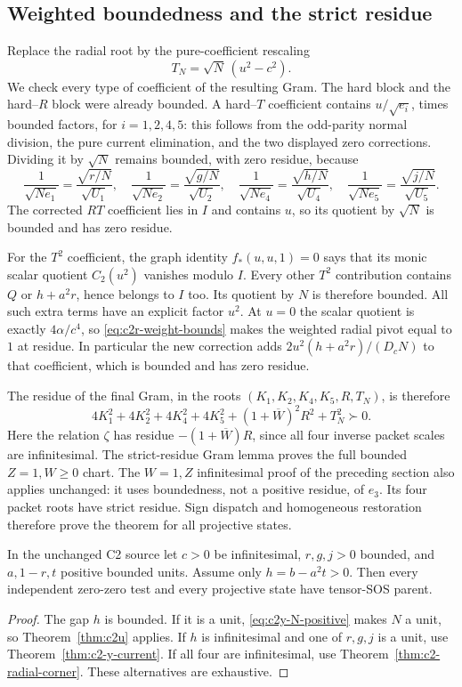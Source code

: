 \subsection{Weighted boundedness and the strict residue}
Replace the radial root by the pure-coefficient rescaling
\[
T_N=\sqrt N\,(u^2-c^2).
\]
We check every type of coefficient of the resulting Gram.  The hard
block and the hard--$R$ block were already bounded.  A hard--$T$
coefficient contains $u/\sqrt{e_i}$, times bounded factors, for
$i=1,2,4,5$: this follows from the odd-parity normal division, the pure
current elimination, and the two displayed zero corrections.  Dividing
it by $\sqrt N$ remains bounded, with zero residue, because
\[
\frac1{\sqrt{Ne_1}}=\frac{\sqrt{r/N}}{\sqrt{U_1}},\quad
\frac1{\sqrt{Ne_2}}=\frac{\sqrt{g/N}}{\sqrt{U_2}},\quad
\frac1{\sqrt{Ne_4}}=\frac{\sqrt{h/N}}{\sqrt{U_4}},\quad
\frac1{\sqrt{Ne_5}}=\frac{\sqrt{j/N}}{\sqrt{U_5}}.
\]
The corrected $RT$ coefficient lies in $I$ and contains $u$, so its
quotient by $\sqrt N$ is bounded and has zero residue.

For the $T^2$ coefficient, the graph identity $f_*(u,u,1)=0$ says that
its monic scalar quotient $C_2(u^2)$ vanishes modulo $I$.  Every other
$T^2$ contribution contains $Q$ or $h+a^2r$, hence belongs to $I$ too.
Its quotient by $N$ is therefore bounded.  All such extra terms have
an explicit factor $u^2$.  At $u=0$ the scalar quotient is exactly
$4\alpha/c^4$, so \eqref{eq:c2r-weight-bounds} makes the weighted radial
pivot equal to $1$ at residue.  In particular the new correction adds
$2u^2(h+a^2r)/(D_cN)$ to that coefficient, which is bounded and has
zero residue.

The residue of the final Gram, in the roots
$(K_1,K_2,K_4,K_5,R,T_N)$, is therefore
\begin{equation}
4K_1^2+4K_2^2+4K_4^2+4K_5^2
 +(1+\overline W)^2R^2+T_N^2\succ0.
\label{eq:c2r-strict-residue}
\end{equation}
Here the relation $\zeta$ has residue $-(1+\overline W)R$, since all
four inverse packet scales are infinitesimal.  The strict-residue Gram
lemma proves the full bounded $Z=1,W\geq0$ chart.  The $W=1,Z$
infinitesimal proof of the preceding section also applies unchanged:
it uses boundedness, not a positive residue, of $e_3$.  Its four packet
roots have strict residue.  Sign dispatch and homogeneous restoration
therefore prove the theorem for all projective states.

\begin{corollary}
\label{cor:c2-bounded-shape}
In the unchanged C2 source let $c>0$ be infinitesimal, $r,g,j>0$
bounded, and $a,1-r,t$ positive bounded units.  Assume only
$h=b-a^2t>0$.  Then every independent zero-zero test and every projective
state have tensor-SOS parent.
\end{corollary}
\begin{proof}
The gap $h$ is bounded.  If it is a unit,
\eqref{eq:c2y-N-positive} makes $N$ a unit, so Theorem~\ref{thm:c2u}
applies.  If $h$ is infinitesimal and one of $r,g,j$ is a unit, use
Theorem~\ref{thm:c2-y-current}.  If all four are infinitesimal, use
Theorem~\ref{thm:c2-radial-corner}.  These alternatives are exhaustive.
\end{proof}
